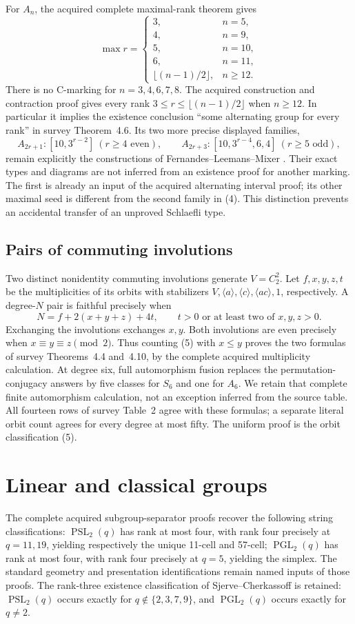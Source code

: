 \documentclass[11pt]{article}
\newcommand{\gen}[1]{\langle#1\rangle}
\newcommand{\PSL}{\operatorname{PSL}}\newcommand{\PGL}{\operatorname{PGL}}
\newcommand{\note}[1]{\marginpar{\raggedright\scriptsize #1}}
\begin{document}
For $A_n$, the acquired complete maximal-rank theorem gives
\[
 \max r=\begin{cases}
 3,&n=5,\\4,&n=9,\\5,&n=10,\\6,&n=11,\\
 \lfloor(n-1)/2\rfloor,&n\ge12.
 \end{cases}                                                   \tag{3}
\]
There is no C-marking for $n=3,4,6,7,8$. The acquired construction
and contraction proof gives every rank $3\le r\le\lfloor(n-1)/2\rfloor$
when $n\ge12$. In particular it implies the existence conclusion
``some alternating group for every rank'' in survey Theorem~4.6.
Its two more precise displayed families,
\[
 A_{2r+1}:[10,3^{r-2}]\ (r\ge4\text{ even}),\qquad
 A_{2r+3}:[10,3^{r-4},6,4]\ (r\ge5\text{ odd}),                \tag{4}
\]
remain explicitly the constructions of Fernandes--Leemans--Mixer
\cite{alt2012}. Their exact types and diagrams are not inferred from
an existence proof for another marking. The first is already an input
of the acquired alternating interval proof; its other maximal seed
is different from the second family in (4). This distinction prevents
an accidental transfer of an unproved Schlaefli type.

\subsection*{Pairs of commuting involutions}
\note{Reuse}
Two distinct nonidentity commuting involutions generate $V=C_2^2$.
Let $f,x,y,z,t$ be the multiplicities of its orbits with stabilizers
$V,\gen a,\gen c,\gen{ac},1$, respectively. A degree-$N$ pair is
faithful precisely when
\[
 N=f+2(x+y+z)+4t,\qquad t>0\text{ or at least two of }x,y,z>0.    \tag{5}
\]
Exchanging the involutions exchanges $x,y$. Both involutions are even
precisely when $x\equiv y\equiv z\pmod2$. Thus counting (5) with
$x\le y$ proves the two formulas of survey Theorems~4.4 and~4.10,
by the complete acquired multiplicity calculation. At degree six,
full automorphism fusion replaces the permutation-conjugacy answers
by five classes for $S_6$ and one for $A_6$. We retain that complete
finite automorphism calculation, not an exception inferred from the
source table. All fourteen rows of survey Table~2 agree with these
formulas; a separate literal orbit count agrees for every degree at
most fifty. The uniform proof is the orbit classification (5).

\section{Linear and classical groups}
The complete acquired subgroup-separator proofs recover the following
string classifications: $\PSL_2(q)$ has rank at most four, with rank
four precisely at $q=11,19$, yielding respectively the unique
11-cell and 57-cell; $\PGL_2(q)$ has rank at most four, with rank
four precisely at $q=5$, yielding the simplex. The standard geometry
and presentation identifications remain named inputs of those proofs.
The rank-three existence classification of Sjerve--Cherkassoff is
retained: $\PSL_2(q)$ occurs exactly for $q\notin\{2,3,7,9\}$,
and $\PGL_2(q)$ occurs exactly for $q\ne2$.
\end{document}
